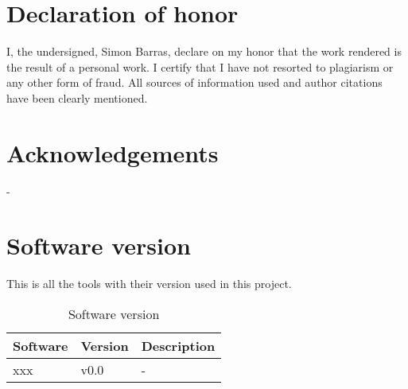 \chapter{Declaration of honor}
\label{ch:honour}
I, the undersigned, Simon Barras, declare on my honor that the work rendered is the result of a
personal work. I certify that I have not resorted to plagiarism or any other form of fraud.
All sources of information used and author citations have been clearly mentioned.



\chapter{Acknowledgements}
\label{ch:remerciement}
-

\chapter{Software version}
\label{ch:software}
This is all the tools with their version used in this project.

\begin{table}[ht]
    \centering
    \begin{tabular}{|l|p{3cm}|l|}
    \hline
    \multicolumn{1}{|c|}{\textbf{Software}} & \multicolumn{1}{c|}{\textbf{Version}} & \multicolumn{1}{c|}{\textbf{Description}} \\ \hline
    xxx                     & v0.0                                  & -        \\ \hline
    \end{tabular}
    \caption{Software version}
    \label{tab:softwareVersion}
\end{table}